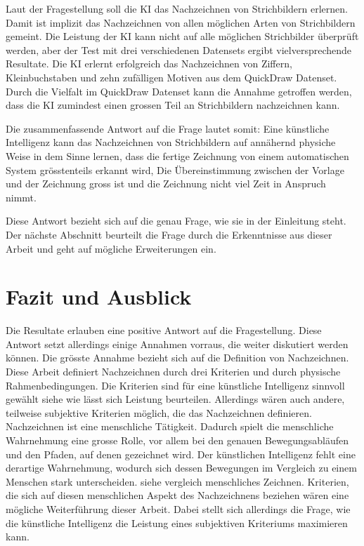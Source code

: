 Laut der Fragestellung soll die KI das Nachzeichnen von Strichbildern erlernen.
Damit ist implizit das Nachzeichnen von allen möglichen Arten von Strichbildern
gemeint. Die Leistung der KI kann nicht auf alle möglichen Strichbilder
überprüft werden, aber der Test mit drei verschiedenen Datensets ergibt
vielversprechende Resultate. Die KI erlernt erfolgreich das Nachzeichnen von
Ziffern, Kleinbuchstaben und zehn zufälligen Motiven aus dem QuickDraw Datenset.
Durch die Vielfalt im QuickDraw Datenset kann die Annahme getroffen werden, dass
die KI zumindest einen grossen Teil an Strichbildern nachzeichnen kann. 

Die zusammenfassende Antwort auf die Frage lautet somit: Eine künstliche
Intelligenz kann das Nachzeichnen von Strichbildern auf annähernd physiche Weise
in dem Sinne lernen, dass die fertige Zeichnung von einem automatischen System
grösstenteils erkannt wird, Die Übereinstimmung zwischen der Vorlage und der
Zeichnung gross ist und die Zeichnung nicht viel Zeit in Anspruch nimmt.

Diese Antwort bezieht sich auf die genau Frage, wie sie in der Einleitung steht.
Der nächste Abschnitt beurteilt die Frage durch die Erkenntnisse aus dieser
Arbeit und geht auf mögliche Erweiterungen ein.



\section{Fazit und Ausblick}
Die Resultate erlauben eine positive Antwort auf die Fragestellung. Diese
Antwort setzt allerdings einige Annahmen vorraus, die weiter diskutiert werden
können. Die grösste Annahme bezieht sich auf die Definition von Nachzeichnen.
Diese Arbeit definiert Nachzeichnen durch drei Kriterien und durch physische
Rahmenbedingungen. Die Kriterien sind für eine künstliche Intelligenz sinnvoll
gewählt {siehe wie lässt sich Leistung beurteilen}. Allerdings wären auch
andere, teilweise subjektive Kriterien möglich, die das Nachzeichnen definieren.
Nachzeichnen ist eine menschliche Tätigkeit. Dadurch spielt die menschliche
Wahrnehmung eine grosse Rolle, vor allem bei den genauen Bewegungsabläufen und
den Pfaden, auf denen gezeichnet wird. Der künstlichen Intelligenz fehlt eine
derartige Wahrnehmung, wodurch sich dessen Bewegungen im Vergleich zu einem
Menschen stark unterscheiden. {siehe vergleich menschliches Zeichnen}.
Kriterien, die sich auf diesen menschlichen Aspekt des Nachzeichnens beziehen
wären eine mögliche Weiterführung dieser Arbeit. Dabei stellt sich allerdings
die Frage, wie die künstliche Intelligenz die Leistung eines subjektiven
Kriteriums maximieren kann.



